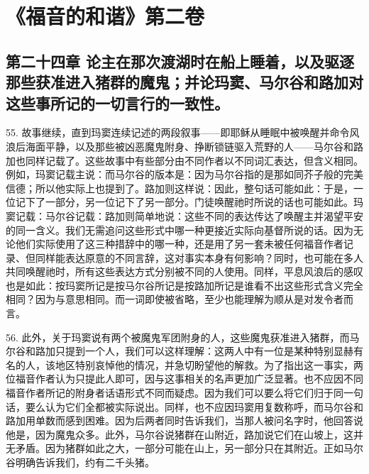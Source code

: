
\section{《福音的和谐》第二卷}


\subsection{第二十四章 论主在那次渡湖时在船上睡着，以及驱逐那些获准进入猪群的魔鬼；并论玛窦、马尔谷和路加对这些事所记的一切言行的一致性。}

55. 故事继续，直到玛窦连续记述的两段叙事——即耶稣从睡眠中被唤醒并命令风浪后海面平静，以及那些被凶恶魔鬼附身、挣断锁链驱入荒野的人——马尔谷和路加也同样记载了。这些故事中有些部分由不同作者以不同词汇表达，但含义相同。例如，玛窦记载主说：而马尔谷的版本是：因为马尔谷指的是那如同芥子般的完美信德；所以他实际上也提到了。路加则这样说：因此，整句话可能如此：于是，一位记下了一部分，另一位记下了另一部分。门徒唤醒祂时所说的话也可能如此。玛窦记载：马尔谷记载：路加则简单地说：这些不同的表达传达了唤醒主并渴望平安的同一含义。我们无需追问这些形式中哪一种更接近实际向基督所说的话。因为无论他们实际使用了这三种措辞中的哪一种，还是用了另一套未被任何福音作者记录、但同样能表达原意的不同言辞，这对事实本身有何影响？同时，也可能在多人共同唤醒祂时，所有这些表达方式分别被不同的人使用。同样，平息风浪后的感叹也是如此：按玛窦所记是按马尔谷所记是按路加所记是谁看不出这些形式含义完全相同？因为与意思相同。而一词即使被省略，至少也能理解为顺从是对发令者而言。\par

56. 此外，关于玛窦说有两个被魔鬼军团附身的人，这些魔鬼获准进入猪群，而马尔谷和路加只提到一个人，我们可以这样理解：这两人中有一位是某种特别显赫有名的人，该地区特别哀悼他的情况，并急切盼望他的解救。为了指出这一事实，两位福音作者认为只提此人即可，因与这事相关的名声更加广泛显著。也不应因不同福音作者所记的附身者话语形式不同而疑虑。因为我们可以要么将它们归于同一句话，要么认为它们全都被实际说出。同样，也不应因玛窦用复数称呼，而马尔谷和路加用单数而感到困难。因为后两者同时告诉我们，当那人被问名字时，他回答说他是，因为魔鬼众多。此外，马尔谷说猪群在山附近，路加说它们在山坡上，这并无矛盾。因为猪群如此之大，一部分可能在山上，另一部分只在其附近。正如马尔谷明确告诉我们，约有二千头猪。\par


